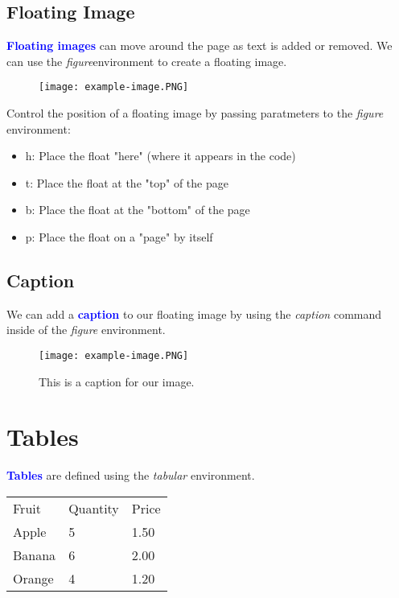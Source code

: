 \documentclass{article}
\newcommand{\kw}[1]{\textcolor{blue}{\textbf{#1}}}
\newcommand{\cmd}[1]{\textit{#1}}
\begin{document}
\subsection{Floating Image}

\kw{Floating images} can move around the page as text is added or removed. We can use the
\cmd{figure}environment to create a floating image.

\begin{figure}[ht]
  \centering
  \texttt{[image: example-image.PNG]}
\end{figure}

Control the position of a floating image by passing paratmeters to the \cmd{figure} environment:

\begin{itemize}
  \item h: Place the float "here" (where it appears in the code)
  \item t: Place the float at the "top" of the page
  \item b: Place the float at the "bottom" of the page
  \item p: Place the float on a "page" by itself
\end{itemize}

\subsection{Caption}

We can add a \kw{caption} to our floating image by using the \cmd{caption} command inside of the
\cmd{figure} environment.

\begin{figure}[h]
  \centering
  \texttt{[image: example-image.PNG]}
  \caption{This is a caption for our image.}
\end{figure}

\section{Tables}

\kw{Tables} are defined using the \cmd{tabular} environment.

\begin{tabular}{*{3}{l}}
  Fruit  & Quantity & Price \\
  Apple  & 5        & 1.50  \\
  Banana & 6        & 2.00  \\
  Orange & 4        & 1.20  \\
\end{tabular}
\end{document}
